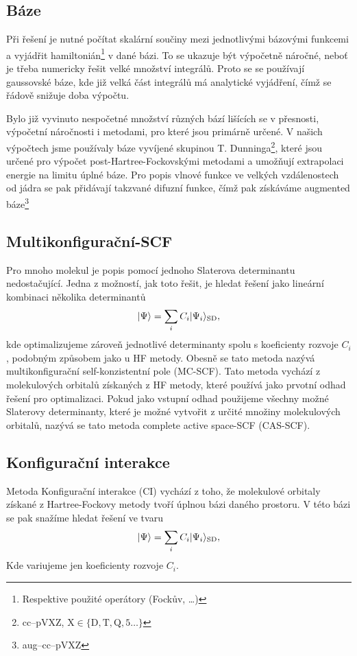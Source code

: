 \subsection{Báze}
Při řešení je nutné počítat skalární součiny mezi jednotlivými bázovými funkcemi a vyjádřit
hamiltonián\footnote{Respektive použité operátory (Fockův, \dots)} v dané bázi. To se ukazuje být výpočetně náročné, neboť je třeba 
numericky řešit velké množství integrálů. Proto se se používají gaussovské báze, kde 
již velká část integrálů má analytické 
vyjádření, čímž se řádově snižuje doba výpočtu.

Bylo již vyvinuto nespočetné množství různých bází lišících se v přesnosti, výpočetní 
náročnosti i metodami, pro které jsou primárně určené.
V našich výpočtech jsme používaly báze vyvíjené 
skupinou T. Dunninga\footnote{cc--pVXZ,  $\mathrm{ X \in \{D,T,Q,5\dots\}}$}\cite{Dunning-basis}, 
které jsou určené pro výpočet post-Hartree-Fockovskými metodami a umožňují extrapolaci 
energie na limitu úplné báze.
Pro popis vlnové funkce ve velkých vzdálenostech od jádra se pak přidávají takzvané 
difuzní funkce, čímž pak získáváme augmented báze\footnote{aug--cc--pVXZ}

\subsection{Multikonfigurační-SCF}
Pro mnoho molekul je popis pomocí jednoho Slaterova determinantu nedostačující.
Jedna z možností, jak toto řešit, je hledat řešení jako lineární kombinaci několika determinantů
\begin{equation}
| \Psi \rangle = \sum_i C_i | \Psi_i \rangle_{\mathrm{SD}},
\end{equation}
kde optimalizujeme zároveň jednotlivé determinanty spolu s koeficienty rozvoje $C_i$, 
podobným způsobem jako u HF metody.
Obesně se tato metoda nazývá multikonfigurační self-konzistentní pole (MC-SCF).
Tato metoda vychází z molekulových orbitalů získaných z HF metody, které používá jako 
prvotní odhad řešení pro optimalizaci.
Pokud jako vstupní odhad použijeme všechny možné Slaterovy determinanty, které je možné  
vytvořit z určité množiny molekulových orbitalů, nazývá se tato metoda complete active space-SCF (CAS-SCF). 

\subsection{Konfigurační interakce}
Metoda Konfigurační interakce (CI) vychází z toho, že molekulové orbitaly získané z Hartree-Fockovy metody tvoří úplnou bázi daného prostoru. V této bázi se pak snažíme hledat řešení ve tvaru
\begin{equation}
| \Psi \rangle = \sum_i C_i | \Psi_i \rangle_{\mathrm{SD}},
\end{equation}
Kde variujeme jen koeficienty rozvoje $C_i$.

